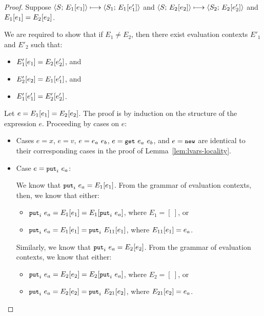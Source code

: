\begin{proof}
  Suppose $\langle S;\, E_1\hspace{-0.5mm}\left[e_1\right] \rangle \longmapsto \langle S_1;\, E_1\hspace{-0.5mm}\left[e'_1\right] \rangle$ and
  $\langle S;\, E_2\hspace{-0.5mm}\left[e_2\right] \rangle \longmapsto
  \langle S_2;\, E_2\hspace{-0.5mm}\left[e'_2\right] \rangle$ and $E_1\hspace{-0.5mm}\left[e_1\right] =
  E_2\hspace{-0.5mm}\left[e_2\right]$.

  We are required to show that if $E_1 \neq E_2$, then there exist
  evaluation contexts $E'_1$ and $E'_2$ such that:
  \begin{itemize}
  \item $E'_1\hspace{-0.5mm}\left[e_1\right] = E_2\hspace{-0.5mm}\left[e'_2\right]$, and
  \item $E'_2\hspace{-0.5mm}\left[e_2\right] = E_1\hspace{-0.5mm}\left[e'_1\right]$, and
  \item $E'_1\hspace{-0.5mm}\left[e'_1\right] = E'_2\hspace{-0.5mm}\left[e'_2\right]$.
  \end{itemize}

  Let $e = E_1\hspace{-0.5mm}\left[e_1\right] = E_2\hspace{-0.5mm}\left[e_2\right]$.  The proof is
  by induction on the structure of the expression $e$.  Proceeding by
  cases on $e$:

  \begin{itemize}

    \item Cases $e = x$, $e = v$, $e = e_a~e_b$, $e = \mbox{\small{\texttt{get}}}~e_a~e_b$, and
      $e = \mbox{\small{\texttt{new}}}$ are identical to their corresponding cases in the proof
      of Lemma~\ref{lem:lvars-locality}.

    \item Case $e = \mbox{\small{\texttt{put}}}_i~e_a$:

      We know that $\mbox{\small{\texttt{put}}}_i~e_a = E_1\hspace{-0.5mm}\left[e_1\right]$.  From the
      grammar of evaluation contexts, then, we know that either:
      \begin{itemize}
        \item $\mbox{\small{\texttt{put}}}_i~e_a = E_1\hspace{-0.5mm}\left[e_1\right] = E_1\hspace{-0.5mm}\left[\mbox{\small{\texttt{put}}}_i~e_a\right]$, where $E_1 = [~]$, or
        \item $\mbox{\small{\texttt{put}}}_i~e_a = E_1\hspace{-0.5mm}\left[e_1\right] =
          \mbox{\small{\texttt{put}}}_i~E_{11}\hspace{-0.5mm}\left[e_1\right]$, where
          $E_{11}\hspace{-0.5mm}\left[e_1\right] = e_a$.
      \end{itemize}

      Similarly, we know that $\mbox{\small{\texttt{put}}}_i~e_a = E_2\hspace{-0.5mm}\left[e_2\right]$.
      From the grammar of evaluation contexts, we know that either:
      \begin{itemize}
        \item $\mbox{\small{\texttt{put}}}_i~e_a = E_2\hspace{-0.5mm}\left[e_2\right] = E_2\hspace{-0.5mm}\left[\mbox{\small{\texttt{put}}}_i~e_a\right]$, where $E_2 = [~]$, or
        \item $\mbox{\small{\texttt{put}}}_i~e_a = E_2\hspace{-0.5mm}\left[e_2\right] =
          \mbox{\small{\texttt{put}}}_i~E_{21}\hspace{-0.5mm}\left[e_2\right]$, where
          $E_{21}\hspace{-0.5mm}\left[e_2\right] = e_a$.
      \end{itemize}


\end{itemize}
\end{proof}
